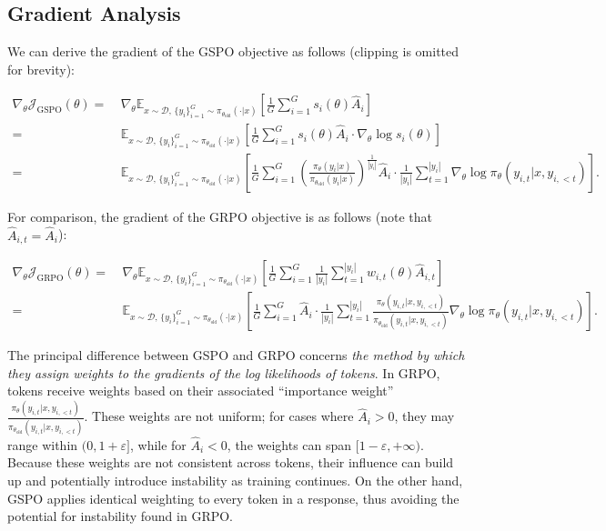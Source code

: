 \subsection{Gradient Analysis}
\label{subsec:gradient}

We can derive the gradient of the GSPO objective as follows (clipping is omitted for brevity):

\begin{align}
\nabla_{\theta} \mathcal{J}_\text{GSPO} (\theta)
=&\ 
\nabla_{\theta} \mathbb{E}_{ x \sim \mathcal{D},\, \{y_i\}_{i=1}^G \sim \pi_{\theta_\text{old}}( \cdot | x) }
\left[ 
\frac{1}{G} \sum_{i=1}^{G} s_{i}(\theta) \widehat{A}_{i}
\right] \\
= &\ 
\mathbb{E}_{ x \sim \mathcal{D},\, \{y_i\}_{i=1}^G \sim \pi_{\theta_\text{old}}( \cdot | x) }
\left[ 
\frac{1}{G} \sum_{i=1}^{G}
s_{i}(\theta) \widehat{A}_{i}
\cdot \nabla_{\theta} \log s_{i}(\theta)
\right] \\
=&\ 
\mathbb{E}_{ x \sim \mathcal{D},\, \{y_i\}_{i=1}^G \sim \pi_{\theta_\text{old}}( \cdot | x) }
\left[ 
\frac{1}{G} \sum_{i=1}^{G} 
\left( \frac{ \pi_{\theta} (y_i | x) }{ \pi_{\theta_\text{old}} (y_i | x)} \right)^{\frac{1}{|y_i|}} \widehat{A}_{i} 
\cdot \frac{1}{|y_i|} \sum_{t=1}^{|y_i|} \nabla_{\theta} \log \pi_{\theta} (y_{i,t} | x, y_{i,<t}) 
\right].
\label{equ:gspo_grad}
\end{align}

For comparison, the gradient of the GRPO objective is as follows (note that $\widehat{A}_{i,t} = \widehat{A}_{i}$):

\begin{align}
\nabla_{\theta} \mathcal{J}_\text{GRPO} (\theta) 
=&\ 
\nabla_{\theta} \mathbb{E}_{ x \sim \mathcal{D},\, \{y_i\}_{i=1}^G \sim \pi_{\theta_\text{old}}( \cdot | x) }
\left[ \frac{1}{G} \sum_{i=1}^{G} \frac{1}{|y_i|} \sum_{t=1}^{|y_i|} 
w_{i,t}(\theta) \widehat{A}_{i,t}
\right] \\
=&\
\mathbb{E}_{ x \sim \mathcal{D},\, \{y_i\}_{i=1}^G \sim \pi_{\theta_\text{old}}( \cdot | x) }
\left[ \frac{1}{G} \sum_{i=1}^{G} \widehat{A}_{i} 
\cdot \frac{1}{|y_i|} \sum_{t=1}^{|y_i|} 
\frac{ \pi_{\theta} (y_{i,t} | x, y_{i,<t}) }{ \pi_{\theta_\text{old}} (y_{i,t} | x,y_{i,<t})} 
\nabla_{\theta} \log \pi_{\theta} (y_{i,t} | x, y_{i,<t})  
\right].
\end{align}

The principal difference between GSPO and GRPO concerns \textit{the method by which they assign weights to the gradients of the log likelihoods of tokens}. In GRPO, tokens receive weights based on their associated “importance weight” $\frac{ \pi_{\theta} (y_{i,t} | x, y_{i,<t}) }{ \pi_{\theta_\text{old}} (y_{i,t} | x, y_{i,<t})}$. These weights are not uniform; for cases where $\widehat{A}_{i} > 0$, they may range within $(0, 1+\varepsilon]$, while for $\widehat{A}_{i} < 0$, the weights can span $[1-\varepsilon, +\infty)$. Because these weights are not consistent across tokens, their influence can build up and potentially introduce instability as training continues. On the other hand, GSPO applies identical weighting to every token in a response, thus avoiding the potential for instability found in GRPO.

